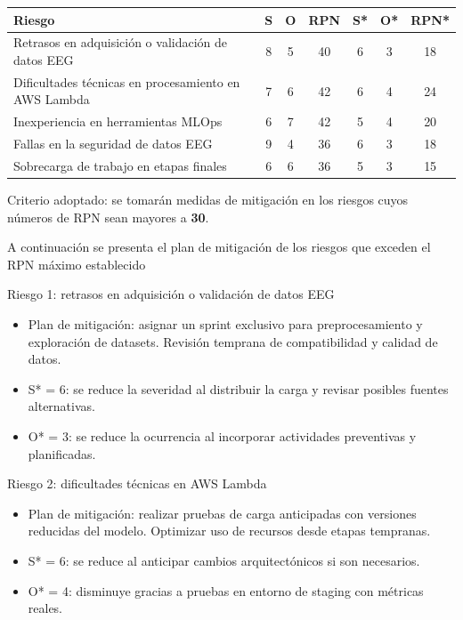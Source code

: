 \documentclass[
11pt, %
]{charter}
\begin{document}
\begin{table}[htpb]
\centering
\begin{tabularx}{\linewidth}{@{}|X|c|c|c|c|c|c|@{}}
\hline
\rowcolor[HTML]{C0C0C0}
\textbf{Riesgo} & \textbf{S} & \textbf{O} & \textbf{RPN} & \textbf{S*} & \textbf{O*} & \textbf{RPN*} \\ \hline
Retrasos en adquisición o validación de datos EEG & 8 & 5 & 40 & 6 & 3 & 18 \\ \hline
Dificultades técnicas en procesamiento en AWS Lambda & 7 & 6 & 42 & 6 & 4 & 24 \\ \hline
Inexperiencia en herramientas MLOps & 6 & 7 & 42 & 5 & 4 & 20 \\ \hline
Fallas en la seguridad de datos EEG & 9 & 4 & 36 & 6 & 3 & 18 \\ \hline
Sobrecarga de trabajo en etapas finales & 6 & 6 & 36 & 5 & 3 & 15 \\ \hline
\end{tabularx}


\end{table}
Criterio adoptado: se tomarán medidas de mitigación en los riesgos cuyos números de RPN sean mayores a \textbf{30}.

A continuación se presenta el plan de mitigación de los riesgos que exceden el RPN máximo establecido


Riesgo 1: retrasos en adquisición o validación de datos EEG
\begin{itemize}
  \item Plan de mitigación: asignar un sprint exclusivo para preprocesamiento y exploración de datasets. Revisión temprana de compatibilidad y calidad de datos.
  \item S* = 6: se reduce la severidad al distribuir la carga y revisar posibles fuentes alternativas.
  \item O* = 3: se reduce la ocurrencia al incorporar actividades preventivas y planificadas.
\end{itemize}

Riesgo 2: dificultades técnicas en AWS Lambda
\begin{itemize}
  \item Plan de mitigación: realizar pruebas de carga anticipadas con versiones reducidas del modelo. Optimizar uso de recursos desde etapas tempranas.
  \item S* = 6: se reduce al anticipar cambios arquitectónicos si son necesarios.
  \item O* = 4: disminuye gracias a pruebas en entorno de staging con métricas reales.
\end{itemize}
\end{document}
